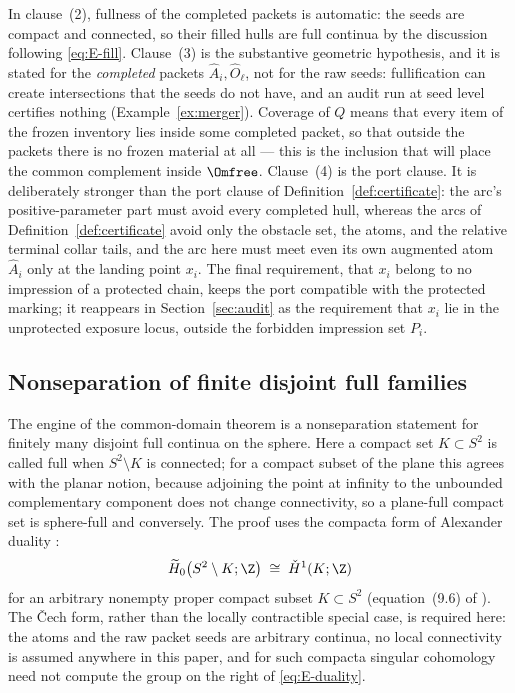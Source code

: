 In clause~(2), fullness of the completed packets is automatic: the seeds are compact
and connected, so their filled hulls are full continua by the discussion following
\eqref{eq:E-fill}. Clause~(3) is the substantive geometric hypothesis, and it is
stated for the \emph{completed} packets $\widehat A_i,\widehat O_\ell$, not for the
raw seeds: fullification can create intersections that the seeds do not have, and an
audit run at seed level certifies nothing (Example~\ref{ex:merger}). Coverage of $Q$
means that every item of the frozen inventory lies inside some completed packet, so
that outside the packets there is no frozen material at all --- this is the inclusion
that will place the common complement inside $\Omfree$. Clause~(4) is the port
clause. It is deliberately stronger than the port clause of
Definition~\ref{def:certificate}: the arc's positive-parameter part must avoid every
completed hull, whereas the arcs of Definition~\ref{def:certificate} avoid only the
obstacle set, the atoms, and the relative terminal collar tails, and the arc here must meet
even its own augmented atom $\widehat A_i$ only at the landing point $x_i$. The final requirement,
that $x_i$ belong to no impression of a protected chain, keeps the port compatible with
the protected marking; it reappears in Section~\ref{sec:audit} as the requirement
that $x_i$ lie in the unprotected exposure locus, outside the forbidden impression
set $P_i$.

\subsection{Nonseparation of finite disjoint full families}\label{subsec:E-duality}

The engine of the common-domain theorem is a nonseparation statement for finitely
many disjoint full continua on the sphere. Here a compact set $K\subset S^2$ is
called full when $S^2\setminus K$ is connected; for a compact subset of the plane
this agrees with the planar notion, because adjoining the point at infinity to the
unbounded complementary component does not change connectivity, so a plane-full
compact set is sphere-full and conversely. The proof uses the compacta form of
Alexander duality \cite[Chapter~6]{Spa66}:
\begin{equation}\label{eq:E-duality}
\widetilde H_0\bigl(S^2\setminus K;\Z\bigr)\;\cong\;\check H^1(K;\Z)
\end{equation}
for an arbitrary nonempty proper compact subset $K\subset S^2$ (equation~(9.6) of
\cite{MWman}). The \v{C}ech form, rather than the locally contractible special case,
is required here: the atoms and the raw packet seeds are arbitrary continua,
no local connectivity is assumed anywhere in this paper, and for such compacta
singular cohomology need not compute the group on the right of
\eqref{eq:E-duality}.

